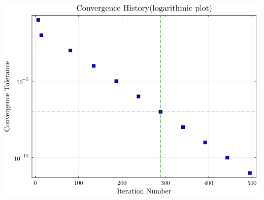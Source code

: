 \documentclass[11pt]{article}
\begin{document}
\begin{center}
\includegraphics[width=.9\linewidth]{./converge_log.png}
\end{center}
\end{document}
